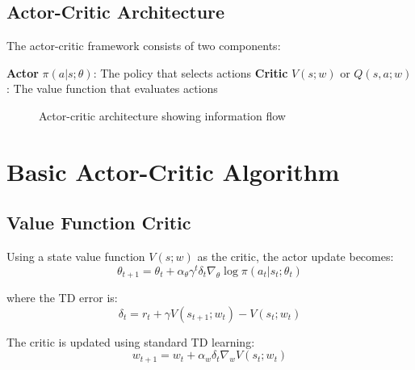 \subsection{Actor-Critic Architecture}

The actor-critic framework consists of two components:

\textbf{Actor} $\pi(a|s; \theta)$: The policy that selects actions
\textbf{Critic} $V(s; w)$ or $Q(s,a; w)$: The value function that evaluates actions

\begin{figure}[h]
\centering
{}
\caption{Actor-critic architecture showing information flow}
\end{figure}

\section{Basic Actor-Critic Algorithm}

\subsection{Value Function Critic}

Using a state value function $V(s; w)$ as the critic, the actor update becomes:
\begin{equation}
\theta_{t+1} = \theta_t + \alpha_\theta \gamma^t \delta_t \nabla_\theta \log \pi(a_t|s_t; \theta_t)
\end{equation}

where the TD error is:
\begin{equation}
\delta_t = r_t + \gamma V(s_{t+1}; w_t) - V(s_t; w_t)
\end{equation}

The critic is updated using standard TD learning:
\begin{equation}
w_{t+1} = w_t + \alpha_w \delta_t \nabla_w V(s_t; w_t)
\end{equation}


